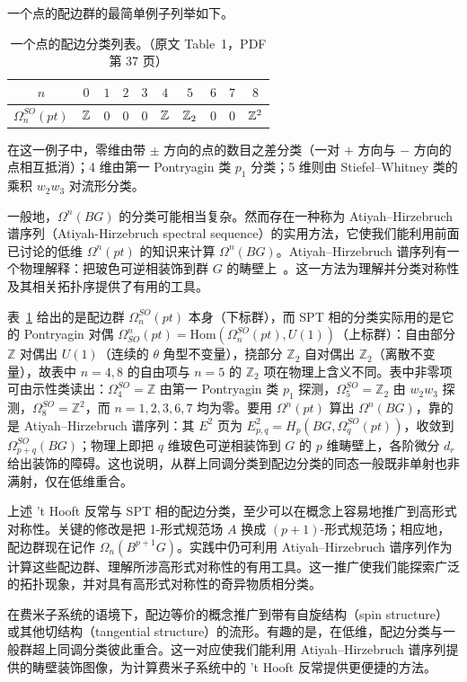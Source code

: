 \begin{example}
一个点的配边群的最简单例子列举如下。
\begin{table}[htbp]
    \centering
    \begin{tabular}{|c|c|c|c|c|c|c|c|c|c|}
    \hline
        $n $ & $0$ & $1$ & $2$ & $3$ & $4$ & $5$ & $6$ & $7$ & $8$ \\
        \hline
        $\Omega_n^{SO}(pt)  $ & ${\mathbb{Z}}$ & $0$ & $0$ & $0$ & ${\mathbb{Z}}$ & ${\mathbb{Z}}_2$ & $0$ & $0$ & ${\mathbb{Z}}^2$ \\
        \hline
    \end{tabular}
    \caption{一个点的配边分类列表。（原文 Table~1，PDF 第 37 页）}
    \label{tab:bordpts}
\end{table}

在这一例子中，零维由带 $\pm$ 方向的点的数目之差分类（一对 $+$ 方向与 $-$ 方向的点相互抵消）；4 维由第一 Pontryagin 类 $p_1$ 分类；5 维则由 Stiefel--Whitney 类的乘积 $w_2w_3$ 对流形分类。
\end{example}

一般地，$\Omega^n(BG)$ 的分类可能相当复杂。然而存在一种称为 Atiyah--Hirzebruch 谱序列（Atiyah-Hirzebruch spectral sequence）的实用方法，它使我们能利用前面已讨论的低维 $\Omega^n(pt)$ 的知识来计算 $\Omega^n(BG)$。Atiyah--Hirzebruch 谱序列有一个物理解释：把玻色可逆相装饰到群 $G$ 的畴壁上~\cite{chen2014symmetry, wang2021domain}。这一方法为理解并分类对称性及其相关拓扑序提供了有用的工具。

\begin{yizhu}表~\ref{tab:bordpts} 给出的是配边群 $\Omega_n^{SO}(pt)$ 本身（下标群），而 SPT 相的分类实际用的是它的 Pontryagin 对偶 $\Omega^n_{SO}(pt)=\mathrm{Hom}(\Omega_n^{SO}(pt),U(1))$（上标群）：自由部分 $\mathbb{Z}$ 对偶出 $U(1)$（连续的 $\theta$ 角型不变量），挠部分 $\mathbb{Z}_2$ 自对偶出 $\mathbb{Z}_2$（离散不变量），故表中 $n=4,8$ 的自由项与 $n=5$ 的 $\mathbb{Z}_2$ 项在物理上含义不同。表中非零项可由示性类读出：$\Omega_4^{SO}=\mathbb{Z}$ 由第一 Pontryagin 类 $p_1$ 探测，$\Omega_5^{SO}=\mathbb{Z}_2$ 由 $w_2w_3$ 探测，$\Omega_8^{SO}=\mathbb{Z}^2$，而 $n=1,2,3,6,7$ 均为零。要用 $\Omega^n(pt)$ 算出 $\Omega^n(BG)$，靠的是 Atiyah--Hirzebruch 谱序列：其 $E^2$ 页为 $E^2_{p,q}=H_p(BG,\Omega_q^{SO}(pt))$，收敛到 $\Omega_{p+q}^{SO}(BG)$；物理上即把 $q$ 维玻色可逆相装饰到 $G$ 的 $p$ 维畴壁上，各阶微分 $d_r$ 给出装饰的障碍。这也说明，从群上同调分类到配边分类的同态一般既非单射也非满射，仅在低维重合。\end{yizhu}

上述 't Hooft 反常与 SPT 相的配边分类，至少可以在概念上容易地推广到高形式对称性。关键的修改是把 1-形式规范场 $A$ 换成 $(p+1)$-形式规范场；相应地，配边群现在记作 $\Omega_n(B^{p+1}G)$。实践中仍可利用 Atiyah--Hirzebruch 谱序列作为计算这些配边群、理解所涉高形式对称性的有用工具。这一推广使我们能探索广泛的拓扑现象，并对具有高形式对称性的奇异物质相分类。

在费米子系统的语境下，配边等价的概念推广到带有自旋结构（spin structure）或其他切结构（tangential structure）的流形。有趣的是，在低维，配边分类与一般群超上同调分类彼此重合。这一对应使我们能利用 Atiyah--Hirzebruch 谱序列提供的畴壁装饰图像，为计算费米子系统中的 't Hooft 反常提供更便捷的方法。
